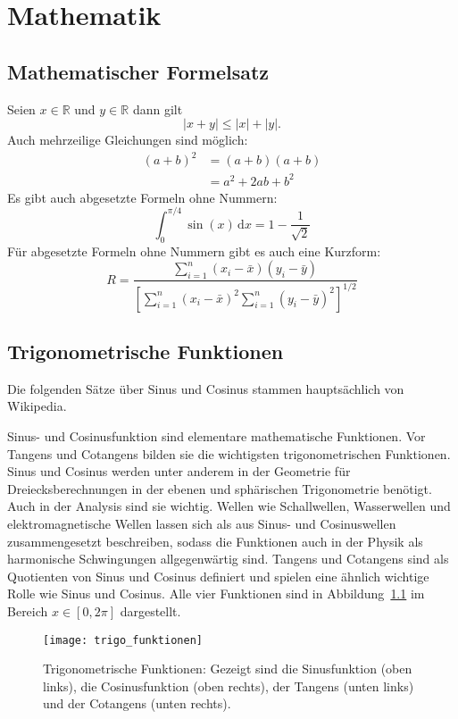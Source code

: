 \chapter{Mathematik}
\label{chap:mathematik}
%
\section{Mathematischer Formelsatz}
Seien \begin{math}x\in\mathbb{R}\end{math} und
$y\in\mathbb{R}$ dann gilt
%
\begin{equation}
  |x+y| \leq |x| + |y|.
\end{equation}
%
Auch mehrzeilige Gleichungen sind möglich:
%
\begin{align}
  (a+b)^{2} & = (a+b)(a+b) \\
           & = a^{2}+2ab+b^{2}
\end{align}
Es gibt auch abgesetzte Formeln ohne Nummern:
%
\begin{equation*}
  \int_{0}^{\pi/4}\sin(x)\,\mathrm{d}x=
  1-\frac{1}{\sqrt{2}}
\end{equation*}
Für abgesetzte Formeln ohne Nummern gibt es auch eine Kurzform:
%
\[
  R=\frac{\sum_{i=1}^{n}(x_{i}-\bar{x})(y_{i}-\bar{y})}{\left[\sum_{i=1}^{n}(x_{i}-\bar{x})^{2}\sum_{i=1}^{n}(y_{i}-\bar{y})^{2}\right]^{1/2}}
\]
%
\section{Trigonometrische Funktionen}
\label{sec:trigo_funk}
Die folgenden Sätze über Sinus und Cosinus stammen hauptsächlich
von Wikipedia.

Sinus- und Cosinusfunktion sind elementare mathematische Funktionen.
Vor Tangens und Cotangens bilden sie die wichtigsten trigonometrischen
Funktionen. Sinus und Cosinus werden unter anderem in der Geometrie
für Dreiecksberechnungen in der ebenen und sphärischen Trigonometrie
benötigt. Auch in der Analysis sind sie wichtig. Wellen wie
Schallwellen, Wasserwellen und elektromagnetische Wellen lassen sich
als aus Sinus- und Cosinuswellen zusammengesetzt beschreiben, sodass
die Funktionen auch in der Physik als harmonische Schwingungen
allgegenwärtig sind. Tangens und Cotangens sind als Quotienten von
Sinus und Cosinus definiert und spielen eine ähnlich wichtige Rolle
wie Sinus und Cosinus. Alle vier Funktionen sind in
Abbildung~\ref{fig:trigo_funk} im Bereich $x\in[0, 2\pi]$ dargestellt.
%
\begin{figure}[ht]
  \centering
  \texttt{[image: trigo\_funktionen]}
  \caption{Trigonometrische Funktionen: Gezeigt sind die Sinusfunktion
    (oben links), die Cosinusfunktion (oben rechts), der Tangens
    (unten links) und der Cotangens (unten rechts).}
  \label{fig:trigo_funk}
\end{figure}
%
